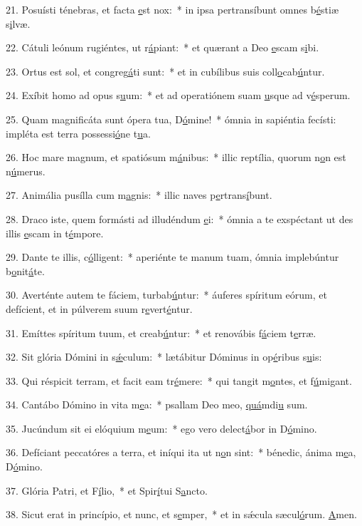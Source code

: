 21. Posuísti ténebras, et facta \uline{e}st nox:~* in ipsa pertransíbunt omnes b\uline{é}stiæ s\uline{i}lvæ.\par 
22. Cátuli leónum rugiéntes, ut r\uline{á}piant:~* et quærant a Deo \uline{e}scam s\uline{i}bi.\par 
23. Ortus est sol, et congreg\uline{á}ti sunt:~* et in cubílibus suis coll\uline{o}cab\uline{ú}ntur.\par 
24. Exíbit homo ad opus s\uline{u}um:~* et ad operatiónem suam \uline{u}sque ad v\uline{é}sperum.\par 
25. Quam magnificáta sunt ópera tua, D\uline{ó}mine!~* ómnia in sapiéntia fecísti: impléta est terra possessi\uline{ó}ne t\uline{u}a.\par 
26. Hoc mare magnum, et spatiósum m\uline{á}nibus:~* illic reptília, quorum n\uline{o}n est n\uline{ú}merus.\par 
27. Animália pusílla cum m\uline{a}gnis:~* illic naves p\uline{e}rtrans\uline{í}bunt.\par 
28. Draco iste, quem formásti ad illudéndum \uline{e}i:~* ómnia a te exspéctant ut des illis \uline{e}scam in t\uline{é}mpore.\par 
29. Dante te illis, c\uline{ó}lligent:~* aperiénte te manum tuam, ómnia implebúntur b\uline{o}nit\uline{á}te.\par 
30. Averténte autem te fáciem, turbab\uline{ú}ntur:~* áuferes spíritum eórum, et defícient, et in púlverem suum r\uline{e}vert\uline{é}ntur.\par 
31. Emíttes spíritum tuum, et creab\uline{ú}ntur:~* et renovábis f\uline{á}ciem t\uline{e}rræ.\par 
32. Sit glória Dómini in s\uline{ǽ}culum:~* lætábitur Dóminus in op\uline{é}ribus s\uline{u}is:\par 
33. Qui réspicit terram, et facit eam tr\uline{é}mere:~* qui tangit m\uline{o}ntes, et f\uline{ú}migant.\par 
34. Cantábo Dómino in vita m\uline{e}a:~* psallam Deo meo, \uline{quá}mdi\uline{u} sum.\par 
35. Jucúndum sit ei elóquium m\uline{e}um:~* ego vero delect\uline{á}bor in D\uline{ó}mino.\par 
36. Defíciant peccatóres a terra, et iníqui ita ut n\uline{o}n sint:~* bénedic, ánima m\uline{e}a, D\uline{ó}mino.\par 
37. Glória Patri, et F\uline{í}lio,~* et Spir\uline{í}tui S\uline{a}ncto.\par 
38. Sicut erat in princípio, et nunc, et s\uline{e}mper,~* et in sǽcula sæcul\uline{ó}rum. \uline{A}men.\par 
